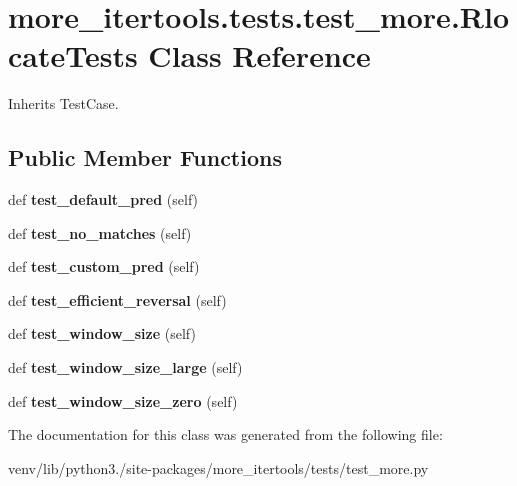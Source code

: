 \hypertarget{classmore__itertools_1_1tests_1_1test__more_1_1_rlocate_tests}{}\section{more\+\_\+itertools.\+tests.\+test\+\_\+more.\+Rlocate\+Tests Class Reference}
\label{classmore__itertools_1_1tests_1_1test__more_1_1_rlocate_tests}


Inherits Test\+Case.

\subsection*{Public Member Functions}
\begin{DoxyCompactItemize}
\item 
\mbox{\label{classmore__itertools_1_1tests_1_1test__more_1_1_rlocate_tests_a82069a94dc715dd56051aa10244a5a14}} 
def {\bfseries test\+\_\+default\+\_\+pred} (self)
\item 
\mbox{\label{classmore__itertools_1_1tests_1_1test__more_1_1_rlocate_tests_a231de11ad859c7c446d6ce3b9ebfc5c9}} 
def {\bfseries test\+\_\+no\+\_\+matches} (self)
\item 
\mbox{\label{classmore__itertools_1_1tests_1_1test__more_1_1_rlocate_tests_a4f4e573b23f9ecf8525408a832132ec9}} 
def {\bfseries test\+\_\+custom\+\_\+pred} (self)
\item 
\mbox{\label{classmore__itertools_1_1tests_1_1test__more_1_1_rlocate_tests_a7cec76d37f9427df66be1fe806920bba}} 
def {\bfseries test\+\_\+efficient\+\_\+reversal} (self)
\item 
\mbox{\label{classmore__itertools_1_1tests_1_1test__more_1_1_rlocate_tests_a4d19aa08ebdc57a331eae248e100ff8e}} 
def {\bfseries test\+\_\+window\+\_\+size} (self)
\item 
\mbox{\label{classmore__itertools_1_1tests_1_1test__more_1_1_rlocate_tests_a43e940103576f1df1d5e62608785c73c}} 
def {\bfseries test\+\_\+window\+\_\+size\+\_\+large} (self)
\item 
\mbox{\label{classmore__itertools_1_1tests_1_1test__more_1_1_rlocate_tests_a83c2e8bacc567e19c71a730f1aa29993}} 
def {\bfseries test\+\_\+window\+\_\+size\+\_\+zero} (self)
\end{DoxyCompactItemize}


The documentation for this class was generated from the following file\+:\begin{DoxyCompactItemize}
\item 
venv/lib/python3./site-\/packages/more\+\_\+itertools/tests/test\+\_\+more.\+py\end{DoxyCompactItemize}
